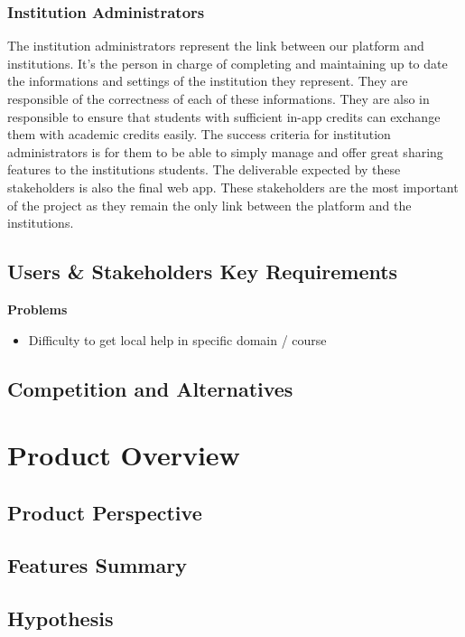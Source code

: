 \documentclass[12pt,a4paper,oneside, titlepage]{article}
\begin{document}
	    \subsubsection{Institution Administrators}
        The institution administrators represent the link between our platform and institutions. It's the person in charge
        of completing and maintaining up to date the informations and settings of the institution they represent. They are
        responsible of the correctness of each of these informations. They are also in responsible to ensure that students
        with sufficient in-app credits can exchange them with academic credits easily. The success criteria for institution
        administrators is for them to be able to simply manage and offer great sharing features to the institutions students.
        The deliverable expected by these stakeholders is also the final web app. These stakeholders are the most important
        of the project as they remain the only link between the platform and the institutions. 
	    
	\subsection{Users \& Stakeholders Key Requirements}
	
	\textbf{Problems}
	\begin{itemize}
	    \item Difficulty to get local help in specific domain / course
	\end{itemize}

	    	
	\subsection{Competition and Alternatives}
	
    \newpage
	\section{Product Overview}
	\subsection{Product Perspective}
	\subsection{Features Summary}
	\subsection{Hypothesis}
\end{document}

